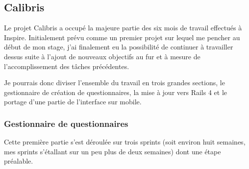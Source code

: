 \documentclass[12pt,a4paper]{book}
\begin{document}
\subsection{Calibris}

Le projet Calibris a occupé la majeure partie des six mois de travail effectués à Inspire. Initialement prévu comme un premier projet sur lequel me pencher au début de mon stage, j'ai finalement eu la possibilité de continuer à travailler dessus suite à l'ajout de nouveaux objectifs au fur et à mesure de l'accomplissement des tâches précédentes.

Je pourrais donc diviser l'ensemble du travail en trois grandes sections, le gestionnaire de création de questionnaires, la mise à jour vers Rails 4 et le portage d'une partie de l'interface sur mobile.

\subsubsection{Gestionnaire de questionnaires}

Cette première partie s'est déroulée sur trois sprints (soit environ huit semaines, mes sprints s'étallant sur un peu plus de deux semaines) dont une étape préalable. 
\end{document}
